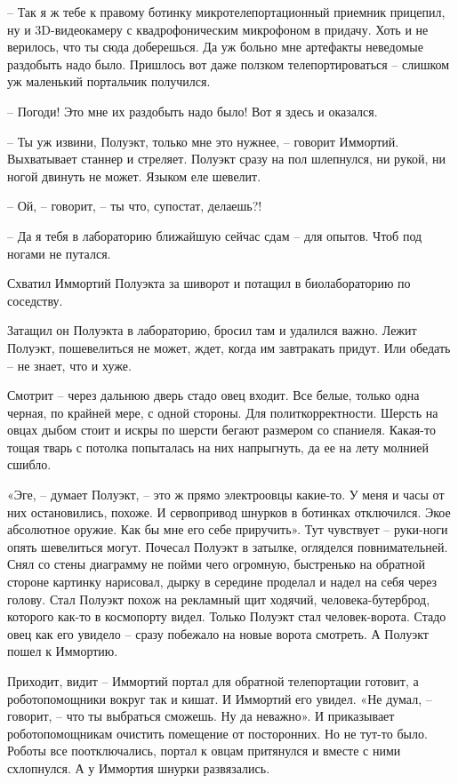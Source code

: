 \documentclass[ebook,oneside,final,openright]{memoir}
\begin{document}
– Так я ж тебе к правому ботинку микротелепортационный приемник прицепил, ну и 3D-видеокамеру с квадрофоническим микрофоном в придачу. Хоть и не верилось, что ты сюда доберешься. Да уж больно мне артефакты неведомые раздобыть надо было. Пришлось вот даже ползком телепортироваться – слишком уж маленький портальчик получился.\par
– Погоди! Это мне их раздобыть надо было! Вот я здесь и оказался.\par
– Ты уж извини, Полуэкт, только мне это нужнее, – говорит Иммортий. Выхватывает станнер и стреляет. Полуэкт сразу на пол шлепнулся, ни рукой, ни ногой двинуть не может. Языком еле шевелит.\par
– Ой, – говорит, – ты что, супостат, делаешь?!\par
– Да я тебя в лабораторию ближайшую сейчас сдам – для опытов. Чтоб под ногами не путался.\par
Схватил Иммортий Полуэкта за шиворот и потащил в биолабораторию по соседству.\par
\par
Затащил он Полуэкта в лабораторию, бросил там и удалился важно. Лежит Полуэкт, пошевелиться не может, ждет, когда им завтракать придут. Или обедать – не знает, что и хуже. \par
Смотрит – через дальнюю дверь стадо овец входит. Все белые, только одна черная, по крайней мере, с одной стороны. Для политкорректности. Шерсть на овцах дыбом стоит и искры по шерсти бегают размером со спаниеля. Какая-то тощая тварь с потолка попыталась на них напрыгнуть, да ее на лету молнией сшибло.\par
\par
«Эге, – думает Полуэкт, – это ж прямо электроовцы какие-то. У меня и часы от них остановились, похоже. И сервопривод шнурков в ботинках отключился. Экое абсолютное оружие. Как бы мне его себе приручить». Тут чувствует – руки-ноги опять шевелиться могут. Почесал Полуэкт в затылке, огляделся повнимательней. Снял со стены диаграмму не пойми чего огромную, быстренько на обратной стороне картинку нарисовал, дырку в середине проделал и надел на себя через голову. Стал Полуэкт похож на рекламный щит ходячий, человека-бутерброд, которого как-то в космопорту видел. Только Полуэкт стал человек-ворота. Стадо овец как его увидело – сразу побежало на новые ворота смотреть. А Полуэкт пошел к Иммортию.\par
\par
Приходит, видит – Иммортий портал для обратной телепортации готовит, а роботопомощники вокруг так и кишат. И Иммортий его увидел. «Не думал, – говорит, – что ты выбраться сможешь. Ну да неважно». И приказывает роботопомощникам очистить помещение от посторонних. Но не тут-то было. Роботы все поотключались, портал к овцам притянулся и вместе с ними схлопнулся. А у Иммортия шнурки развязались.\par
\end{document}
